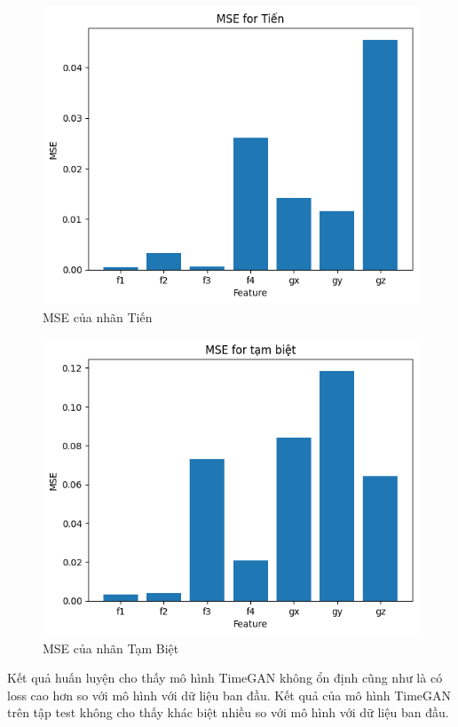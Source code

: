 \begin{figure}[H]
    \centering
    \includegraphics[width=1\textwidth]{Images/Improvement results/MSE_tien.png}
    \caption{MSE của nhãn Tiến}
    \label{fig:timegan_mse}
\end{figure}

\begin{figure}[H]
    \centering
    \includegraphics[width=1\textwidth]{Images/Improvement results/MSE_tambiet.png}
    \caption{MSE của nhãn Tạm Biệt}
    \label{fig:timegan_mse}
\end{figure}

Kết quả huấn luyện cho thấy mô hình TimeGAN không ổn định cũng như là có loss cao hơn so với mô hình với dữ liệu ban đầu. Kết quả của mô hình TimeGAN trên tập test không cho thấy khác biệt nhiều so với mô hình với dữ liệu ban đầu.

